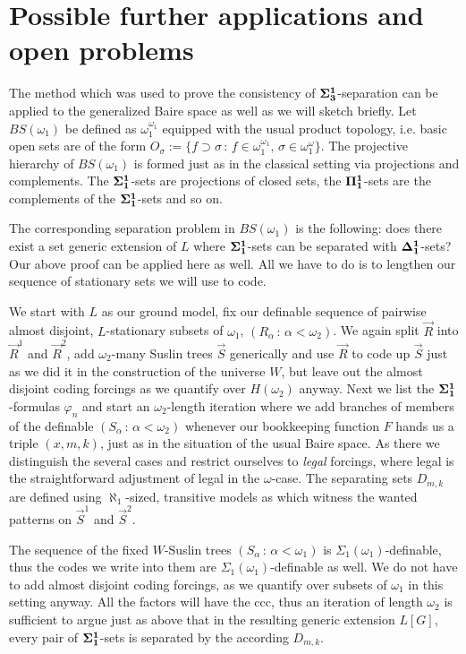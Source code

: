 \documentclass[a4paper,11pt]{article}
\begin{document}
\section{Possible further applications and open problems}


The method which was used to prove the consistency of $\bf{\Sigma^1_{3}}$-separation can be applied to the generalized Baire space as well as we will sketch briefly. Let $BS(\omega_1)$ be defined as $\omega_1^{\omega_1}$ equipped with the usual product topology, i.e. basic open sets are of the form $O_{\sigma} :=\{ f \supset \sigma \, : \, f \in  \omega_1^{\omega_1}, \, \sigma \in \omega_1^{\omega} \}$. The projective hierarchy of $BS(\omega_1)$ is formed just as in the classical setting via projections and complements. The $\bf{\Sigma^1_{1}}$-sets are projections of closed sets, the $\bf{\Pi^1_{1}}$-sets are the complements of the $\bf{\Sigma^1_{1}}$-sets and so on.

The corresponding separation problem in $BS(\omega_1)$ is the following: does there exist a set generic extension of $L$ where $\bf{\Sigma^1_1}$-sets can be separated with $\bf{\Delta^1_1}$-sets?
Our above proof can be applied here as well. All we have to do is to lengthen our sequence of stationary sets we will use to code.

We start with $L$ as our ground model, fix our definable sequence of pairwise almost disjoint, $L$-stationary subsets of $\omega_1$, $(R_{\alpha} \, : \, \alpha < \omega_2)$.  We again split $\vec{R}$ into $\vec{R}^1$ and $\vec{R}^2$, add $\omega_2$-many Suslin trees $\vec{S}$ generically and use $\vec{R}$ to code up $\vec{S}$ just as we did it in the construction of the universe $W$, but leave out the almost disjoint coding forcings as we quantify over $H(\omega_2)$ anyway.
Next we list the $\bf{\Sigma^1_1}$-formulas $\varphi_n$ and start an $\omega_2$-length iteration where we add branches of members of the definable $(S_{\alpha} \, : \, \alpha < \omega_2)$ whenever our bookkeeping function $F$ hands us a triple $(x,m,k)$, just as in the situation of the usual Baire space. As there we distinguish the several cases and restrict ourselves to \emph{legal} forcings, where legal is the straightforward adjustment of legal in the $\omega$-case. The separating sets $D_{m,k}$ are defined using $\aleph_1$-sized, transitive models as which witness the wanted patterns on $\vec{S}^1$ and $\vec{S}^2.$

The sequence of the fixed $W$-Suslin trees $(S_{\alpha} \, : \, \alpha < \omega_1)$ is $\Sigma_1 (\omega_1)$-definable, thus the codes we write into them are $\Sigma_1(\omega_1)$-definable as well. We do not have to add almost disjoint coding forcings, as we quantify over subsets of $\omega_1$ in this setting anyway. All the factors will have the ccc, thus an iteration of length $\omega_2$ is sufficient to argue just as above that in the resulting generic extension $L[G]$, every pair of $\bf{\Sigma^1_1}$-sets is separated by the according $D_{m,k}$.
\end{document}
